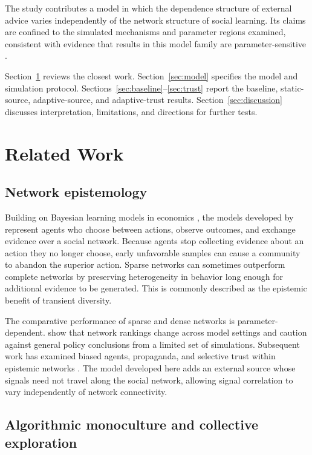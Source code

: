 \documentclass[10pt,letterpaper,twocolumn]{article}
\begin{document}
The study contributes a model in which the dependence structure of external advice varies independently of the network structure of social learning. Its claims are confined to the simulated mechanisms and parameter regions examined, consistent with evidence that results in this model family are parameter-sensitive \citep{rosenstock2017}.

Section~\ref{sec:related} reviews the closest work. Section~\ref{sec:model} specifies the model and simulation protocol. Sections~\ref{sec:baseline}--\ref{sec:trust} report the baseline, static-source, adaptive-source, and adaptive-trust results. Section~\ref{sec:discussion} discusses interpretation, limitations, and directions for further tests.

\section{Related Work}
\label{sec:related}

\subsection{Network epistemology}

Building on Bayesian learning models in economics \citep{balagoyal1998}, the models developed by \citet{zollman2007,zollman2010} represent agents who choose between actions, observe outcomes, and exchange evidence over a social network. Because agents stop collecting evidence about an action they no longer choose, early unfavorable samples can cause a community to abandon the superior action. Sparse networks can sometimes outperform complete networks by preserving heterogeneity in behavior long enough for additional evidence to be generated. This is commonly described as the epistemic benefit of transient diversity.

The comparative performance of sparse and dense networks is parameter-dependent. \citet{rosenstock2017} show that network rankings change across model settings and caution against general policy conclusions from a limited set of simulations. Subsequent work has examined biased agents, propaganda, and selective trust within epistemic networks \citep{weatherall2020,oconnor2019}. The model developed here adds an external source whose signals need not travel along the social network, allowing signal correlation to vary independently of network connectivity.

\subsection{Algorithmic monoculture and collective exploration}
\end{document}
